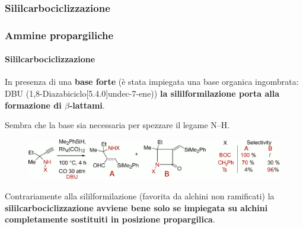 \subsubsection{Sililcarbociclizzazione}\begin{frame}\frametitle{Ammine propargiliche}\framesubtitle{Sililcarbociclizzazione}
In presenza di una {\bf base forte} (è stata impiegata una base organica ingombrata: DBU (1,8-Diazabiciclo[5.4.0]undec-7-ene)) {\bf la sililformilazione porta alla formazione di $\beta$-lattami}. 

Sembra che la base sia necessaria per spezzare il legame N--H.
\begin{figure}{\includegraphics[width=1\textwidth]{img/substrati/ammine-cicliz.png}}\end{figure}
\pause
Contrariamente alla sililformilazione (favorita da alchini non ramificati) la {\bf sililcarbociclizzazione avviene bene solo se impiegata su alchini completamente sostituiti in posizione propargilica}.

\end{frame}

\logo{}
